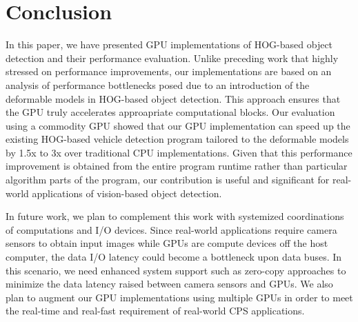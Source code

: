 \section{Conclusion}
\label{sec:conclusion}

In this paper, we have presented GPU implementations of HOG-based object
detection and their performance evaluation.
Unlike preceding work that highly stressed on performance improvements,
our implementations are based on an analysis of performance bottlenecks
posed due to an introduction of the deformable models in HOG-based
object detection.
This approach ensures that the GPU truly accelerates approapriate
computational blocks.
Our evaluation using a commodity GPU showed that our GPU implementation
can speed up the existing HOG-based vehicle detection program tailored
to the deformable models by 1.5x to 3x over traditional CPU
implementations.
Given that this performance improvement is obtained from the entire
program runtime rather than particular algorithm parts of the program,
our contribution is useful and significant for real-world applications
of vision-based object detection. 

In future work, we plan to complement this work with systemized
coordinations of computations and I/O devices.
Since real-world applications require camera sensors to obtain input
images while GPUs are compute devices off the host computer, the data
I/O latency could become a bottleneck upon data buses.
In this scenario, we need enhanced system support such as zero-copy
approaches \cite{Kato13} to minimize the data latency raised between
camera sensors and GPUs.
We also plan to augment our GPU implementations using multiple GPUs in
order to meet the real-time and real-fast requirement of real-world CPS
applications.
